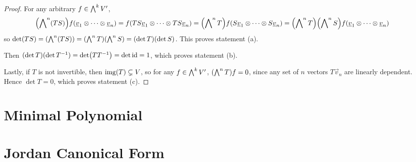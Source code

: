 \begin{proof}
    For any arbitrary \(f \in \operatorname{{\bigwedge}}^k V'\),
    \begin{eqnarray}
        \pqty{\Asym^n (TS)} f(\vec{v}_1 \otimes \cdots \otimes \vec{v}_n)
        = f(TS\vec{v}_1 \otimes \cdots \otimes TS\vec{v}_n)
        = \pqty{\Asym^n T} f(S\vec{v}_1 \otimes \cdots \otimes S\vec{v}_n)
        = \pqty{\Asym^n T}\pqty{\Asym^n S} f(\vec{v}_1 \otimes \cdots \otimes \vec{v}_n)
    \end{eqnarray}
    so \(\det(TS) = \pqty{\Asym^n (TS)} = \pqty{\Asym^n T}\pqty{\Asym^n S} = (\det T)(\det S)\).
    This proves statement (a).

    Then \((\det T)(\det T^{-1}) = \det(TT^{-1}) = \det\operatorname{id} = 1\),
    which proves statement (b).

    Lastly, if \(T\) is not invertible, then \(\operatorname{img}(T) \subsetneq V\),
    so for any \(f \in \operatorname{{\bigwedge}}^k V'\), \(\pqty{\Asym^n T} f = 0\),
    since any set of \(n\) vectors \(T\vec{v}_n\) are linearly dependent.
    Hence \(\det T = 0\), which proves statement (c).
\end{proof}


\section{Minimal Polynomial}


\section{Jordan Canonical Form}
